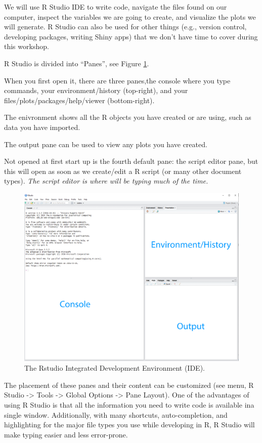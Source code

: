 \documentclass[12pt,]{book}
\theoremstyle{definition}
\theoremstyle{definition}
\theoremstyle{definition}
\theoremstyle{remark}
\begin{document}
We will use R Studio IDE to write code, navigate the files found on our
computer, inspect the variables we are going to create, and visualize
the plots we will generate. R Studio can also be used for other things
(e.g., version control, developing packages, writing Shiny apps) that we
don't have time to cover during this workshop.

R Studio is divided into ``Panes'', see Figure \ref{fig:rstudio}.

When you first open it, there are three panes,the console where you type
commands, your environment/history (top-right), and your
files/plots/packages/help/viewer (bottom-right).

The enivronment shows all the R objects you have created or are using,
such as data you have imported.

The output pane can be used to view any plots you have created.

Not opened at first start up is the fourth default pane: the script
editor pane, but this will open as soon as we create/edit a R script (or
many other document types). \emph{The script editor is where will be
typing much of the time.}



\begin{figure}

{\centering \includegraphics[width=0.8\linewidth]{img/rstudio_ide_image} 

}

\caption{The Rstudio Integrated Development Environment (IDE).}\label{fig:rstudio}
\end{figure}

The placement of these panes and their content can be customized (see
menu, R Studio -\textgreater{} Tools -\textgreater{} Global Options
-\textgreater{} Pane Layout). One of the advantages of using R Studio is
that all the information you need to write code is available ina single
window. Additionally, with many shortcuts, auto-completion, and
highlighting for the major file types you use while developing in R, R
Studio will make typing easier and less error-prone.
\end{document}
